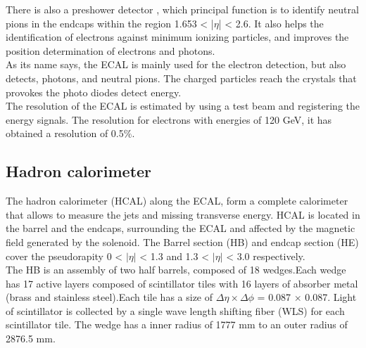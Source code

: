 There is also a preshower detector , which principal function  is to identify neutral pions in the
endcaps within the region 1.653 < |$\eta$| < 2.6. It also helps the identification of electrons
against minimum ionizing particles, and improves the position determination of electrons and photons.
\\

As its name says, the ECAL is mainly used for the electron detection, but also detects, photons, and neutral pions. The charged particles reach the crystals that provokes the photo diodes detect energy.\\
The  resolution of the ECAL is estimated by using a test beam and registering the energy signals. The resolution for electrons with energies of 120 GeV, it has obtained a resolution of 0.5$\%$.
 


\subsection{Hadron calorimeter}
The hadron calorimeter (HCAL) along the ECAL, form a complete calorimeter that allows to measure the jets and missing transverse energy. HCAL is located in the barrel and the endcaps, surrounding the ECAL and affected by the magnetic field generated by the solenoid. The Barrel section (HB) and endcap section (HE)  cover the pseudorapity 0 < $|\eta|$ < 1.3 and  1.3 < $|\eta|$ < 3.0 respectively.\\ 


The HB is an assembly of two half barrels, composed of 18 wedges.Each wedge has 17 active layers composed of scintillator tiles with 16 layers of absorber metal (brass and stainless steel).Each tile has a size of $\Delta \eta × \Delta \phi$ = 0.087 $\times$ 0.087. Light of scintillator is collected by a single wave
length shifting fiber (WLS) for each scintillator tile. The wedge has a inner radius of 1777 mm to an outer radius of 2876.5 mm. 
\\

